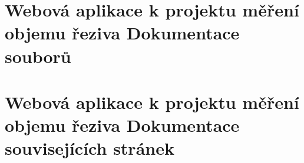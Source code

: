 \documentclass[a4paper]{book}
\begin{document}
\chapter{Webová aplikace k projektu měření objemu řeziva Dokumentace souborů}
























































\chapter{Webová aplikace k projektu měření objemu řeziva Dokumentace souvisejících stránek}


\printindex
\end{document}

